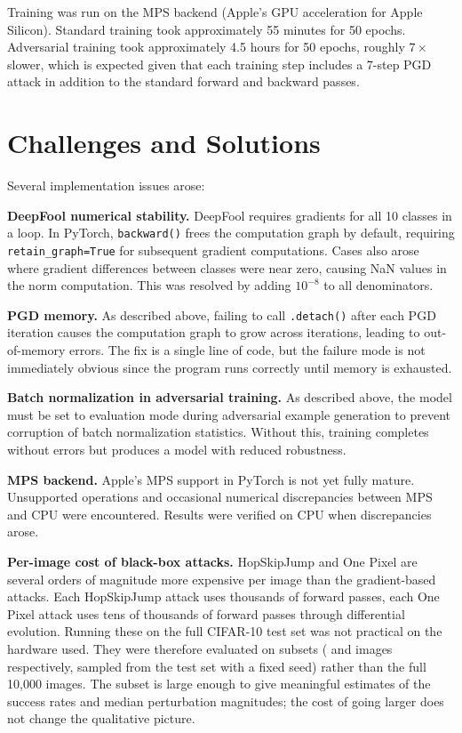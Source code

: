Training was run on the MPS backend (Apple's GPU acceleration for Apple Silicon). Standard training took approximately 55 minutes for 50 epochs. Adversarial training took approximately 4.5 hours for 50 epochs, roughly $7\times$ slower, which is expected given that each training step includes a 7-step PGD attack in addition to the standard forward and backward passes.

\section{Challenges and Solutions}

Several implementation issues arose:

\textbf{DeepFool numerical stability.} DeepFool requires gradients for all 10 classes in a loop. In PyTorch, \texttt{backward()} frees the computation graph by default, requiring \texttt{retain\_graph=True} for subsequent gradient computations. Cases also arose where gradient differences between classes were near zero, causing NaN values in the norm computation. This was resolved by adding $10^{-8}$ to all denominators.

\textbf{PGD memory.} As described above, failing to call \texttt{.detach()} after each PGD iteration causes the computation graph to grow across iterations, leading to out-of-memory errors. The fix is a single line of code, but the failure mode is not immediately obvious since the program runs correctly until memory is exhausted.

\textbf{Batch normalization in adversarial training.} As described above, the model must be set to evaluation mode during adversarial example generation to prevent corruption of batch normalization statistics. Without this, training completes without errors but produces a model with reduced robustness.

\textbf{MPS backend.} Apple's MPS support in PyTorch is not yet fully mature. Unsupported operations and occasional numerical discrepancies between MPS and CPU were encountered. Results were verified on CPU when discrepancies arose.

\textbf{Per-image cost of black-box attacks.} HopSkipJump and One Pixel are several orders of magnitude more expensive per image than the gradient-based attacks. Each HopSkipJump attack uses thousands of forward passes, each One Pixel attack uses tens of thousands of forward passes through differential evolution. Running these on the full CIFAR-10 test set was not practical on the hardware used. They were therefore evaluated on subsets (\HSJN{} and \OPN{} images respectively, sampled from the test set with a fixed seed) rather than the full 10,000 images. The subset is large enough to give meaningful estimates of the success rates and median perturbation magnitudes; the cost of going larger does not change the qualitative picture.

